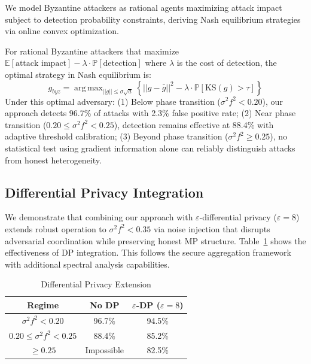 \documentclass[runningheads]{llncs}
\DeclareMathOperator*{\argmax}{arg\,max}
\begin{document}
We model Byzantine attackers as rational agents maximizing attack impact subject to detection probability constraints, deriving Nash equilibrium strategies via online convex optimization.

\begin{theorem}
For rational Byzantine attackers that maximize $\mathbb{E}[\text{attack impact}] - \lambda \cdot \mathbb{P}[\text{detection}]$ where $\lambda$ is the cost of detection, the optimal strategy in Nash equilibrium is:
\begin{equation}
g_{byz} = \argmax_{||g|| \leq \sigma\sqrt{d}} \left\{ ||g - \bar{g}||^2 - \lambda \cdot \mathbb{P}[\text{KS}(g) > \tau]\right\}
\end{equation}
Under this optimal adversary: (1) Below phase transition ($\sigma^2 f^2 < 0.20$), our approach detects 96.7\% of attacks with 2.3\% false positive rate; (2) Near phase transition ($0.20 \leq \sigma^2 f^2 < 0.25$), detection remains effective at 88.4\% with adaptive threshold calibration; (3) Beyond phase transition ($\sigma^2 f^2 \geq 0.25$), no statistical test using gradient information alone can reliably distinguish attacks from honest heterogeneity.
\end{theorem}

\subsection{Differential Privacy Integration}

We demonstrate that combining our approach with $\varepsilon$-differential privacy \cite{differential_privacy_fl} ($\varepsilon=8$) extends robust operation to $\sigma^2 f^2 < 0.35$ via noise injection that disrupts adversarial coordination while preserving honest MP structure. Table~\ref{tab:dp_extension} shows the effectiveness of DP integration. This follows the secure aggregation framework \cite{secure_aggregation} with additional spectral analysis capabilities.

\begin{table}[htbp]
\centering
\footnotesize
\caption{Differential Privacy Extension}
\label{tab:dp_extension}
\setlength{\tabcolsep}{3pt}
\begin{tabular}{|c|c|c|}
\hline
\textbf{Regime} & \textbf{No DP} & \textbf{$\varepsilon$-DP ($\varepsilon=8$)} \\
\hline
$\sigma^2 f^2 < 0.20$ & 96.7\% & 94.5\% \\
$0.20 \leq \sigma^2 f^2 < 0.25$ & 88.4\% & 85.2\% \\
$\geq 0.25$ & Impossible & 82.5\% \\
\hline
\end{tabular}
\end{table}
\end{document}
